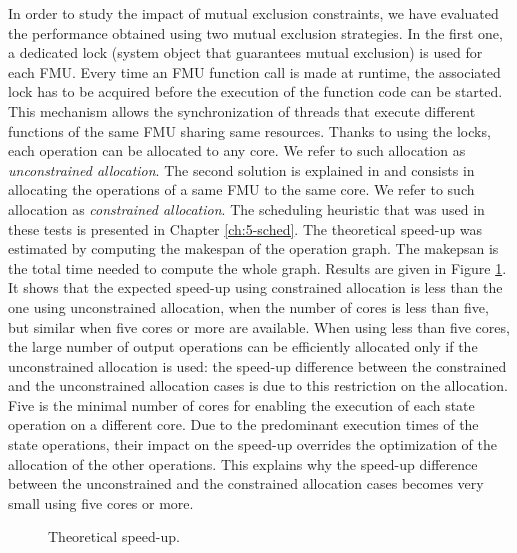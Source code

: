 In order to study the impact of mutual exclusion constraints, we have evaluated the performance obtained using two mutual exclusion strategies. In the first one, a dedicated lock (system object that guarantees mutual exclusion) is used for each FMU. Every time an FMU function call is made at runtime, the associated lock has to be acquired before the execution of the function code can be started. This mechanism allows the synchronization of threads that execute different functions of the same FMU sharing same resources. Thanks to using the locks, each operation can be allocated to any core. We refer to such allocation as \textit{unconstrained allocation}. The second solution is explained in \cite{benkhaled:2014} and consists in allocating the operations of a same FMU to the same core. We refer to such allocation as \textit{constrained allocation}. The scheduling heuristic that was used in these tests is presented in Chapter \ref{ch:5-sched}. The theoretical speed-up was estimated by computing the makespan of the operation graph. The makepsan is the total time needed to compute the whole graph. Results are given in Figure \ref{fig:theoretical-speedup}. It shows that the expected speed-up using constrained allocation is less than the one using unconstrained allocation, when the number of cores is less than five, but similar when five cores or more are available. When using less than five cores, the large number of output operations can be efficiently allocated only if the unconstrained allocation is used: the speed-up difference between the constrained and the unconstrained allocation cases is due to this restriction on the allocation. Five is the minimal number of cores for enabling the execution of each state operation on a different core. Due to the predominant execution times of the state operations, their impact on the speed-up overrides the optimization of the allocation of the other operations. This explains why the speed-up difference between the unconstrained and the constrained allocation cases becomes very small using five cores or more.

\begin{figure}[phbt]
\centering

\caption{Theoretical speed-up.}
\label{fig:theoretical-speedup}
\end{figure}

